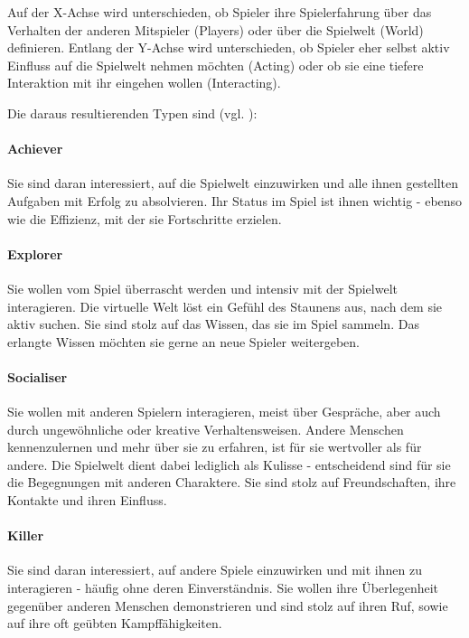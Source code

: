 Auf der X-Achse wird unterschieden, ob Spieler ihre Spielerfahrung über das Verhalten der anderen Mitspieler (Players) oder über die Spielwelt (World) definieren. Entlang der Y-Achse wird unterschieden, ob Spieler eher selbst aktiv Einfluss auf die Spielwelt nehmen möchten (Acting) oder ob sie eine tiefere Interaktion mit ihr eingehen wollen (Interacting).

Die daraus resultierenden Typen sind (vgl. \citealp{bartle_hearts_1996}):
\paragraph{Achiever}
Sie sind daran interessiert, auf die Spielwelt einzuwirken und alle ihnen gestellten Aufgaben mit Erfolg zu absolvieren. Ihr Status im Spiel ist ihnen wichtig - ebenso wie die Effizienz, mit der sie Fortschritte erzielen.

\paragraph{Explorer}
Sie wollen vom Spiel überrascht werden und intensiv mit der Spielwelt interagieren. Die virtuelle Welt löst ein Gefühl des Staunens aus, nach dem sie aktiv suchen. Sie sind stolz auf das Wissen, das sie im Spiel sammeln. Das erlangte Wissen möchten sie gerne an neue Spieler weitergeben.

\paragraph{Socialiser}
Sie wollen mit anderen Spielern interagieren, meist über Gespräche, aber auch durch ungewöhnliche oder kreative Verhaltensweisen. Andere Menschen kennenzulernen und mehr über sie zu erfahren, ist für sie wertvoller als für andere. Die Spielwelt dient dabei lediglich als Kulisse - entscheidend sind für sie die Begegnungen mit anderen Charaktere. Sie sind stolz auf Freundschaften, ihre Kontakte und ihren Einfluss.

\paragraph{Killer}
Sie sind daran interessiert, auf andere Spiele einzuwirken und mit ihnen zu interagieren - häufig ohne deren Einverständnis. Sie wollen ihre Überlegenheit gegenüber anderen Menschen demonstrieren und sind stolz auf ihren Ruf, sowie auf ihre oft geübten Kampffähigkeiten.

